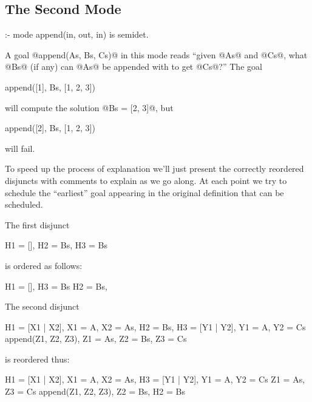 \subsection{The Second Mode}

\begin{myverbatim}
:- mode append(in, out, in) is semidet.
\end{myverbatim}
A goal @append(As, Bs, Cs)@ in this mode reads ``given @As@ and @Cs@,
what @Bs@ (if any) can @As@ be appended with to get @Cs@?''  The goal
\begin{myverbatim}
    append([1], Bs, [1, 2, 3])
\end{myverbatim}
will compute the solution @Bs = [2, 3]@, but
\begin{myverbatim}
    append([2], Bs, [1, 2, 3])
\end{myverbatim}
will fail.

To speed up the process of explanation we'll just present the correctly
reordered disjuncts with comments to explain as we go along.  At each
point we try to schedule the ``earliest'' goal appearing in the original
definition that can be scheduled.

The first disjunct
\begin{myverbatim}
    H1 = [],
    H2 = Bs,
    H3 = Bs
\end{myverbatim}
is ordered as follows:
\begin{myverbatim}
    H1 = [],            %
    H3 = Bs             %
    H2 = Bs,            %
\end{myverbatim}

The second disjunct
\begin{myverbatim}
    H1 = [X1 | X2],  X1 = A,  X2 = As,
    H2 = Bs,
    H3 = [Y1 | Y2],  Y1 = A,  Y2 = Cs
    append(Z1, Z2, Z3),  Z1 = As,  Z2 = Bs,  Z3 = Cs
\end{myverbatim}
is reordered thus:
\begin{myverbatim}
    H1 = [X1 | X2],     %
    X1 = A,             %
    X2 = As,            %
    H3 = [Y1 | Y2],     %
    Y1 = A,             %
    Y2 = Cs             %
    Z1 = As,            %
    Z3 = Cs             %
    append(Z1, Z2, Z3), %
    Z2 = Bs,            %
    H2 = Bs             %
\end{myverbatim}

